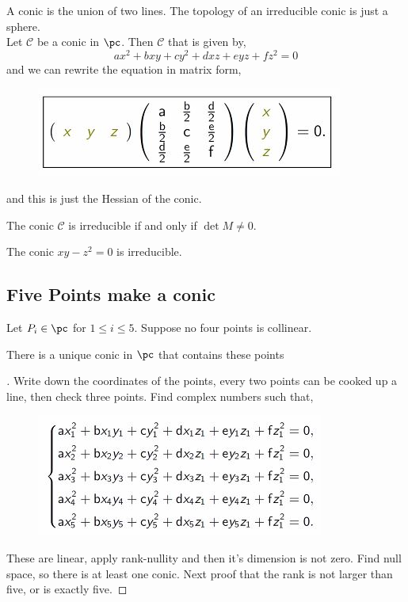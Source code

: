 \documentclass{article}
\begin{document}
A conic is the union of two lines. The topology of an irreducible conic is just a sphere.\\

Let $\mathcal{C}$ be a conic in $\pc$. Then $\mathcal{C}$ that is given by,
$$ ax^2 + bxy + cy^2 + dxz + eyz + fz^2 = 0 $$
and we can rewrite the equation in matrix form,
\begin{figure}[!ht]
\centering
\includegraphics{./figures/L2.1}
\end{figure}

and this is just the Hessian of the conic.
 \begin{nlemma}[]
   The conic $\mathcal{C}$ is irreducible if and only if $\det M \ne 0$.
 \end{nlemma}

\begin{eg}
  The conic $xy - z^2 = 0$ is irreducible.
\end{eg}

\subsection{Five Points make a conic}
Let $P_i \in \pc$ for $1\le i \le 5$. Suppose no four points is collinear.

\begin{nthm}[]
  There is a unique conic in $\pc$ that contains these points
\end{nthm}

\begin{proof}[]
  Write down the coordinates of the points, every two points can be cooked up a line, then check three points. Find complex numbers such that,
  \begin{figure}[!ht]
  \centering
  \includegraphics{./figures/L2.2}
  \caption{}
  \end{figure}
These are linear, apply rank-nullity and then it's dimension is not zero. Find null space, so there is at least one conic. Next proof that the rank is not larger than five, or is exactly five.
\end{proof}
\end{document}
